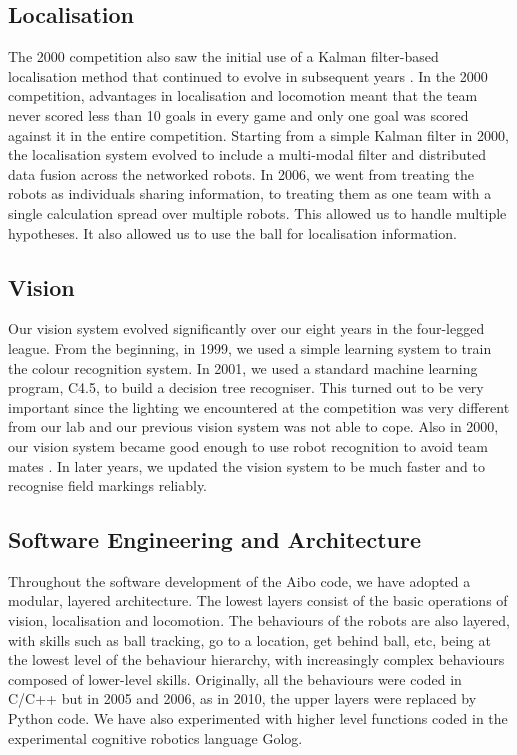 \documentclass[pdftex,11pt,a4paper]{report}
\begin{document}
\subsection{Localisation}
The 2000 competition also saw the initial use of a Kalman filter-based localisation method that continued to evolve in subsequent years \cite{DBLP:conf/robocup/PhamHIS01}. In the 2000 competition, advantages in localisation and locomotion meant that the team never scored less than 10 goals in every game and only one goal was scored against it in the entire competition. Starting from a simple Kalman filter in 2000, the localisation system evolved to include a multi-modal filter and distributed data fusion across the networked robots. In 2006, we went from treating the robots as individuals sharing information, to treating them as one team with a single calculation spread over multiple robots.  This allowed us to handle multiple hypotheses.  It also allowed us to use the ball for localisation information.

\subsection{Vision}
Our vision system evolved significantly over our eight years in the four-legged league. From the beginning, in 1999, we used a simple learning system to train the colour recognition system. In 2001, we used a standard machine learning program, C4.5, to build a decision tree recogniser. This turned out to be very important since the lighting we encountered at the competition was very different from our lab and our previous vision system was not able to cope. Also in 2000, our vision system became good enough to use robot recognition to avoid team mates \cite{DBLP:conf/isrr/SammutH01}. In later years, we updated the vision system to be much faster and to recognise field markings reliably.

\subsection{Software Engineering and Architecture}
Throughout the software development of the Aibo code, we have adopted a modular, layered architecture. The lowest layers consist of the basic operations of vision, localisation and locomotion. The behaviours of the robots are also layered, with skills such as ball tracking, go to a location, get behind ball, etc, being at the lowest level of the behaviour hierarchy, with increasingly complex behaviours composed of lower-level skills. Originally, all the behaviours were coded in C/C++ but in 2005 and 2006, as in 2010, the upper layers were replaced by Python code.  We have also experimented with higher level functions coded in the experimental cognitive robotics language Golog. 
\end{document}

